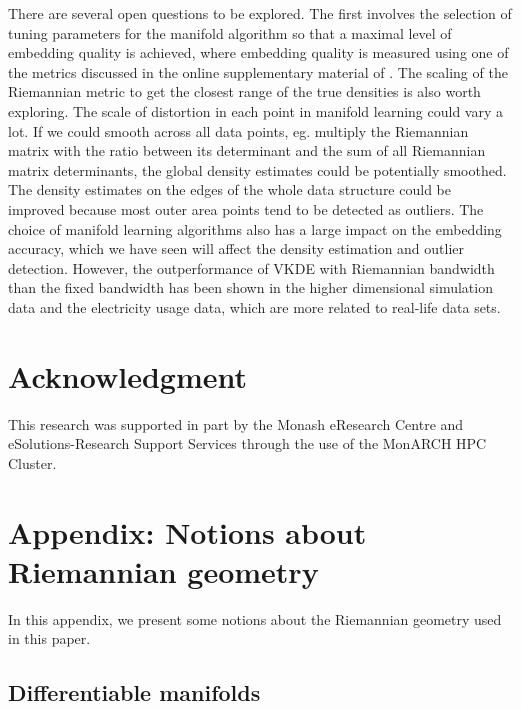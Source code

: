 \documentclass[11pt,a4paper,]{article}
\begin{document}
There are several open questions to be explored. The first involves the selection of tuning parameters for the manifold algorithm so that a maximal level of embedding quality is achieved, where embedding quality is measured using one of the metrics discussed in the online supplementary material of \textcite{Cheng2021-ex}. The scaling of the Riemannian metric to get the closest range of the true densities is also worth exploring. The scale of distortion in each point in manifold learning could vary a lot. If we could smooth across all data points, eg. multiply the Riemannian matrix with the ratio between its determinant and the sum of all Riemannian matrix determinants, the global density estimates could be potentially smoothed. The density estimates on the edges of the whole data structure could be improved because most outer area points tend to be detected as outliers. The choice of manifold learning algorithms also has a large impact on the embedding accuracy, which we have seen will affect the density estimation and outlier detection. However, the outperformance of VKDE with Riemannian bandwidth than the fixed bandwidth has been shown in the higher dimensional simulation data and the electricity usage data, which are more related to real-life data sets.

\hypertarget{acknowledgment}{%
\section*{Acknowledgment}\label{acknowledgment}}

This research was supported in part by the Monash eResearch Centre and eSolutions-Research Support Services through the use of the MonARCH HPC Cluster.

\clearpage\appendix

\hypertarget{riemgeo}{%
\section{Appendix: Notions about Riemannian geometry}\label{riemgeo}}

In this appendix, we present some notions about the Riemannian geometry used in this paper.

\hypertarget{differentiable-manifolds}{%
\subsection{Differentiable manifolds}\label{differentiable-manifolds}}
\end{document}
